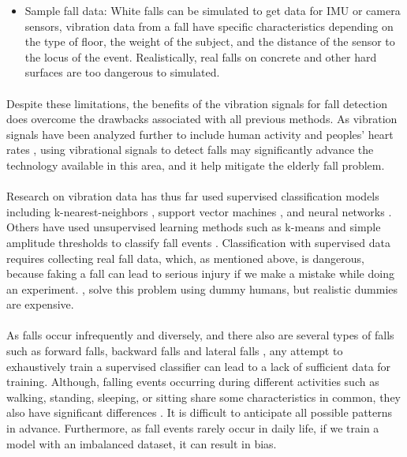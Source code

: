\begin{enumerate}
\begin{itemize}
\item Sample fall data: White falls can be simulated to get data for IMU or camera sensors, vibration data from a fall have specific characteristics depending on the type of floor, the weight of the subject, and the distance of the sensor to the locus of the event. Realistically, real falls on concrete and other hard surfaces are too dangerous to simulated.
\end{itemize}
\end{enumerate}

\paragraph{}
Despite these limitations, the benefits of the vibration signals for fall detection does overcome the drawbacks associated with all previous methods. As vibration signals have been analyzed further to include human activity and peoples’ heart rates \cite{jia_howard_zhang_zhang_2017}, using vibrational signals to detect falls may significantly advance the technology available in this area, and it help mitigate the elderly fall problem.

\paragraph{}
Research on vibration data has thus far used supervised classification models including k-nearest-neighbors \cite{shao_wang_song_ilyas_guo_chang_2020}, support vector machines \cite{wang_chen_zhou_sun_dong_2015, kasturi_jo_2017,liu_jiang_su_benzoni_maxwell_2019}, and neural networks \cite{sultana_deb_dhar_koshiba_2021}. Others have used unsupervised learning methods such as k-means \cite{shao_wang_song_ilyas_guo_chang_2020} and simple amplitude thresholds to classify fall events \cite{alwan_rajendran_kell_mack_dalal_wolfe_felder_2006,charlon_bourennane_bettahar_campo_2013,britto_filho_lubaszewski_2020}. Classification with supervised data requires collecting real fall data, which, as mentioned above, is dangerous, because faking a fall can lead to serious injury if we make a mistake while doing an experiment. \citeauthor{liu_jiang_su_benzoni_maxwell_2019}, \citeyear{liu_jiang_su_benzoni_maxwell_2019} solve this problem using dummy humans, but realistic dummies are expensive.

\paragraph{}
As falls occur infrequently and diversely, and there also are several types of falls such as forward falls, backward falls and lateral falls \cite{el-bendary_tan_c_pivot_lam_2013}, any attempt to exhaustively train a supervised classifier can lead to a lack of sufficient data for training. Although, falling events occurring during different activities such as walking, standing, sleeping, or sitting share some characteristics in common, they also have significant differences \cite{wang_ellul_azzopardi_2020}. It is difficult to anticipate all possible patterns in advance. Furthermore, as fall events rarely occur in daily life, if we train a model with an imbalanced dataset, it can result in bias.

